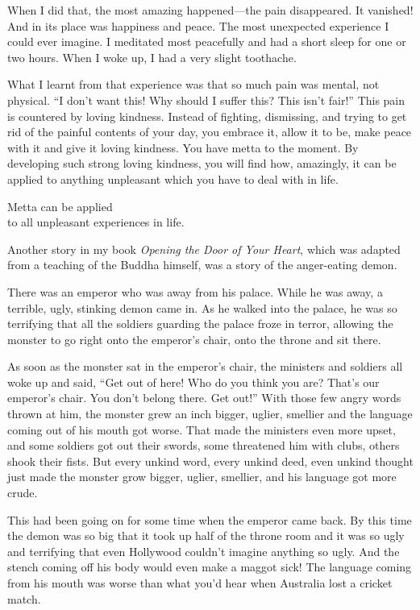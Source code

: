 \documentclass[12pt, openany]{book}
\newenvironment{aphorism}%
{%
\begin{center}\begin{itshape}
}%
{\end{itshape}\end{center}
}%
\begin{document}
When I did that, the most amazing happened—the pain disappeared. It vanished! And in its place was happiness and peace. The most unexpected experience I could ever imagine. I meditated most peacefully and had a short sleep for one or two hours. When I woke up, I had a very slight toothache. 

What I learnt from that experience was that so much pain was mental, not physical. “I don’t want this! Why should I suffer this? This isn’t fair!” This pain is countered by loving kindness. Instead of fighting, dismissing, and trying to get rid of the painful contents of your day, you embrace it, allow it to be, make peace with it and give it loving kindness. You have metta to the moment. By developing such strong loving kindness, you will find how, amazingly, it can be applied to anything unpleasant which you have to deal with in life. 

\begin{aphorism}
Metta can be applied\\  
to all unpleasant experiences in life.
\end{aphorism}

Another story in my book \emph{Opening the Door of Your Heart}, which was adapted from a teaching of the Buddha himself, was a story of the anger-eating demon. 

There was an emperor who was away from his palace. While he was away, a terrible, ugly, stinking demon came in. As he walked into the palace, he was so terrifying that all the soldiers guarding the palace froze in terror, allowing the monster to go right onto the emperor’s chair, onto the throne and sit there. 

As soon as the monster sat in the emperor’s chair, the ministers and soldiers all woke up and said, “Get out of here! Who do you think you are? That’s our emperor’s chair. You don’t belong there. Get out!” With those few angry words thrown at him, the monster grew an inch bigger, uglier, smellier and the language coming out of his mouth got worse. That made the ministers even more upset, and some soldiers got out their swords, some threatened him with clubs, others shook their fists. But every unkind word, every unkind deed, even unkind thought just made the monster grow bigger, uglier, smellier, and his language got more crude. 

This had been going on for some time when the emperor came back. By this time the demon was so big that it took up half of the throne room and it was so ugly and terrifying that even Hollywood couldn’t imagine anything so ugly. And the stench coming off his body would even make a maggot sick! The language coming from his mouth was worse than what you’d hear when Australia lost a cricket match. 
\end{document}
